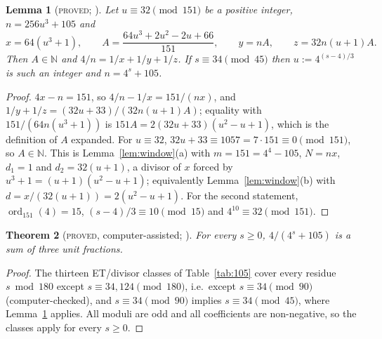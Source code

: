 \documentclass[11pt,reqno]{amsart}
\newtheorem{theorem}{Theorem}[section]
\newtheorem{lemma}[theorem]{Lemma}
\theoremstyle{definition}
\newcommand{\N}{\mathbb N}
\newcommand{\ord}{\operatorname{ord}}
\newcommand{\status}[1]{\textup{\textsc{#1}}}
\begin{document}
\begin{lemma}[\status{proved}; {\cite[Lemmas~1.0, 1.0$'$]{Sparks6}}]\label{lem:105class}
Let $u\equiv32\pmod{151}$ be a positive integer, $n=256u^3+105$ and
\[
 x=64(u^3+1),\qquad A=\frac{64u^3+2u^2-2u+66}{151},\qquad y=nA,\qquad z=32n(u+1)A .
\]
Then $A\in\N$ and $4/n=1/x+1/y+1/z$.  If $s\equiv34\pmod{45}$ then
$u:=4^{(s-4)/3}$ is such an integer and $n=4^s+105$.
\end{lemma}

\begin{proof}
$4x-n=151$, so $4/n-1/x=151/(nx)$, and
$1/y+1/z=(32u+33)/(32n(u+1)A)$; equality with $151/(64n(u^3+1))$ is
$151A=2(32u+33)(u^2-u+1)$, which is the definition of $A$ expanded.  For
$u\equiv32$, $32u+33\equiv1057=7\cdot151\equiv0\pmod{151}$, so
$A\in\N$.  This is Lemma~\ref{lem:window}(a) with $m=151=4^4-105$,
$N=nx$, $d_1=1$ and $d_2=32(u+1)$, a divisor of $x$ forced by
$u^3+1=(u+1)(u^2-u+1)$; equivalently Lemma~\ref{lem:window}(b) with
$d=x/(32(u+1))=2(u^2-u+1)$.  For the second statement,
$\ord_{151}(4)=15$, $(s-4)/3\equiv10\pmod{15}$ and $4^{10}\equiv32\pmod{151}$.
\end{proof}

\begin{theorem}[\status{proved}, computer-assisted; {\cite[Thm.~1.1]{Sparks6}}]\label{thm:105}
For every $s\ge0$, $4/(4^s+105)$ is a sum of three unit fractions.
\end{theorem}

\begin{proof}
The thirteen ET/divisor classes of Table~\ref{tab:105} cover every residue
$s\bmod180$ except $s\equiv34,124\pmod{180}$, i.e.\ except $s\equiv34\pmod{90}$
(computer-checked), and $s\equiv34\pmod{90}$ implies
$s\equiv34\pmod{45}$, where Lemma~\ref{lem:105class} applies.  All moduli are
odd and all coefficients are non-negative, so the classes apply for every
$s\ge0$.
\end{proof}
\end{document}
